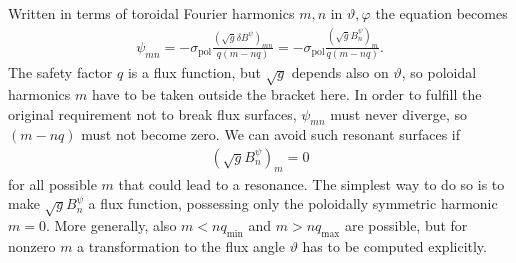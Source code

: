 \documentclass[a4paper, 10pt, english]{article}
\let\temp\varrho
\let\varrho\rho
\let\rho\temp
\let\temp\vartheta
\let\vartheta\theta
\let\theta\temp
\let\temp\varphi
\let\varphi\phi
\let\phi\temp
\newcommand*\pol{\ensuremath{\textrm{pol}}}  %
\begin{document}
Written in terms of toroidal Fourier harmonics $m, n$ in $\theta, \phi$ the equation becomes
\begin{gather*}
  \psi_{m n} = -\sigma_{\pol} \frac{\left( \sqrt{g} \delta B^{\psi} \right)_{m n}}{q (m - n q)} = -\sigma_{\pol} \frac{\left( \sqrt{g} B_{n}^{\psi} \right)_{m}}{q (m - n q)}.
\end{gather*}
The safety factor $q$ is a flux function, but $\sqrt{g}$ depends also on $\theta$, so poloidal harmonics $m$ have to be taken outside the bracket here. In order to fulfill the original requirement not to break flux surfaces, $\psi_{m n}$ must never diverge, so $(m - n q)$ must not become zero. We can avoid such resonant surfaces if
\begin{gather*}
  \left( \sqrt{g} B_{n}^{\psi} \right)_{m} = 0
\end{gather*}
for all possible $m$ that could lead to a resonance. The simplest way to do so is to make $\sqrt{g} B_{n}^{\psi}$ a flux function, possessing only the poloidally symmetric harmonic $m = 0$. More generally, also $m < n q_{\text{min}}$ and $m > n q_{\text{max}}$ are possible, but for nonzero $m$ a transformation to the flux angle $\theta$ has to be computed explicitly.
\end{document}
